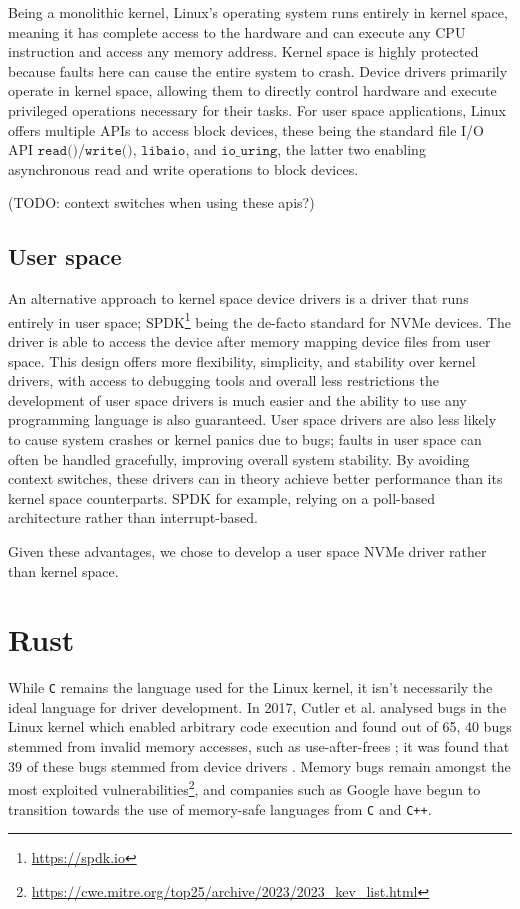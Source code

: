 Being a monolithic kernel, Linux's operating system runs entirely in kernel space, meaning it has complete access to the hardware and can execute any CPU instruction and access any memory address. Kernel space is highly protected because faults here can cause the entire system to crash. Device drivers primarily operate in kernel space, allowing them to directly control hardware and execute privileged operations necessary for their tasks. For user space applications, Linux offers multiple APIs to access block devices, these being the standard file I/O API $\texttt{read()}$/$\texttt{write()}$, $\texttt{libaio}$, and $\texttt{io\_uring}$, the latter two enabling asynchronous read and write operations to block devices.

(TODO: context switches when using these apis?)

\subsection{User space}
An alternative approach to kernel space device drivers is a driver that runs entirely in user space; SPDK\footnote{\url{https://spdk.io}} being the de-facto standard for NVMe devices. The driver is able to access the device after memory mapping device files from user space. This design offers more flexibility, simplicity, and stability over kernel drivers, with access to debugging tools and overall less restrictions the development of user space drivers is much easier and the ability to use any programming language is also guaranteed. User space drivers are also less likely to cause system crashes or kernel panics due to bugs; faults in user space can often be handled gracefully, improving overall system stability. By avoiding context switches, these drivers can in theory achieve better performance than its kernel space counterparts. SPDK for example, relying on a poll-based architecture rather than interrupt-based.

Given these advantages, we chose to develop a user space NVMe driver rather than kernel space.

\section{Rust}
While \texttt{C} remains the language used for the Linux kernel, it isn't necessarily the ideal language for driver development. In 2017, Cutler et al. analysed bugs in the Linux kernel which enabled arbitrary code execution and found out of 65, 40 bugs stemmed from invalid memory accesses, such as use-after-frees \cite{cutler}; it was found that 39 of these bugs stemmed from device drivers \cite{driver_lang}. Memory bugs remain amongst the most exploited vulnerabilities\footnote{\url{https://cwe.mitre.org/top25/archive/2023/2023_kev_list.html}}, and companies such as Google have begun to transition towards the use of memory-safe languages from \texttt{C} and \texttt{C++}.

